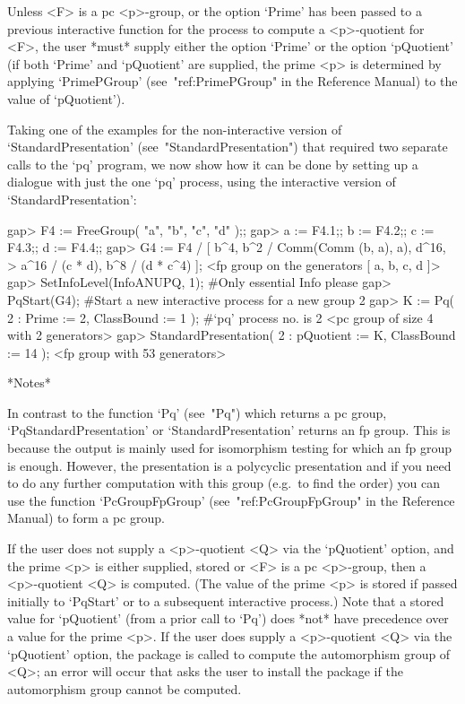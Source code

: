 \endlist

Unless <F> is a pc <p>-group, or the option `Prime' has been passed to  a
previous interactive function for the process to compute  a  <p>-quotient
for <F>, the user *must* supply either the option `Prime' or  the  option
`pQuotient' (if both `Prime' and `pQuotient' are supplied, the prime  <p>
is determined by applying  `PrimePGroup'  (see~"ref:PrimePGroup"  in  the
Reference Manual) to the value of `pQuotient').

Taking  one  of  the  examples  for  the   non-interactive   version   of
`StandardPresentation'  (see~"StandardPresentation")  that  required  two
separate calls to the `pq' program, we now show how it  can  be  done  by
setting up  a  dialogue  with  just  the  one  `pq'  process,  using  the
interactive version of `StandardPresentation':

\beginexample
gap> F4 := FreeGroup( "a", "b", "c", "d" );;
gap> a := F4.1;; b := F4.2;; c := F4.3;; d := F4.4;;
gap> G4 := F4 / [ b^4, b^2 / Comm(Comm (b, a), a), d^16,
>                 a^16 / (c * d), b^8 / (d * c^4) ];
<fp group on the generators [ a, b, c, d ]>
gap> SetInfoLevel(InfoANUPQ, 1); #Only essential Info please
gap> PqStart(G4); #Start a new interactive process for a new group
2
gap> K := Pq( 2 : Prime := 2, ClassBound := 1 ); #`pq' process no. is 2
<pc group of size 4 with 2 generators>
gap> StandardPresentation( 2 : pQuotient := K, ClassBound := 14 );
<fp group with 53 generators>
\endexample

*Notes*

In contrast  to the  function `Pq' (see~"Pq")  which returns a  pc group,
`PqStandardPresentation' or `StandardPresentation' returns an  fp  group.
This is because the output is mainly used  for  isomorphism  testing  for
which an fp group is enough. However, the presentation  is  a  polycyclic
presentation and if you need to do  any  further  computation  with  this
group (e.g.~to find the order) you can use the function  `PcGroupFpGroup'
(see~"ref:PcGroupFpGroup" in the {\GAP} Reference Manual) to  form  a  pc
group.

If the user does not  supply  a  <p>-quotient  <Q>  via  the  `pQuotient'
option, and the prime <p> is either supplied,  stored  or  <F>  is  a  pc
<p>-group, then a <p>-quotient <Q> is computed. (The value of  the  prime
<p> is stored if  passed  initially  to  `PqStart'  or  to  a  subsequent
interactive process.) Note that a stored value for  `pQuotient'  (from  a
prior call to `Pq') does *not* have precedence over a value for the prime
<p>. If the user does supply  a  <p>-quotient  <Q>  via  the  `pQuotient'
option, the package {\AutPGrp} is  called  to  compute  the  automorphism
group of <Q>; an error will occur that  asks  the  user  to  install  the
package {\AutPGrp} if the automorphism group cannot be computed.

